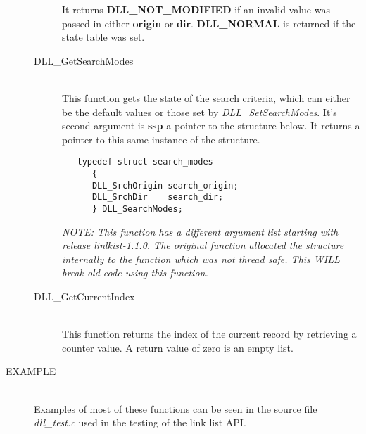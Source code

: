 \documentclass[10pt,letterpaper,titlepage]{article}
\begin{document}
\begin{description}
\begin{description}
 It returns \textbf{DLL\_NOT\_MODIFIED} if an invalid value was passed in either \textbf{origin} or \textbf{dir}.  \textbf{DLL\_NORMAL} is returned if the state table was set.

 \item[DLL\_GetSearchModes]\quad\\
 This function gets the state of the search criteria, which can either be the default values or those set by \emph{DLL\_SetSearchModes}.  It's second argument is \textbf{ssp} a pointer to the structure below.  It returns a pointer to this same instance of the structure.

 \begin{verbatim}
   typedef struct search_modes
      {
      DLL_SrchOrigin search_origin;
      DLL_SrchDir    search_dir;
      } DLL_SearchModes;
 \end{verbatim}

\emph{NOTE: This function has a different argument list starting with release linlkist-1.1.0.  The original function allocated the structure internally to the function which was not thread safe.  This WILL break old code using this function.}

 \item[DLL\_GetCurrentIndex]\quad\\
 This function returns the index of the current record by retrieving a counter value.  A return value of zero is an empty list.
 \end{description}

\item[EXAMPLE]\quad\\
Examples of most of these functions can be seen in the source file \emph{dll\_test.c} used in the testing of the link list API.

\end{description}
\pagebreak
\end{document}

